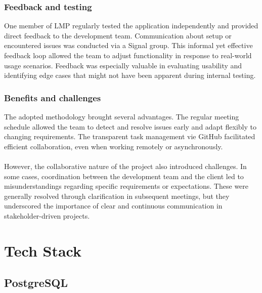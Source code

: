 \documentclass[a4paper,12pt]{report}
\begin{document}
\subsection{Feedback and testing}
One member of LMP regularly tested the application independently and provided direct feedback to the development team. Communication about setup or encountered issues was conducted via a Signal group. This informal yet effective feedback loop allowed the team to adjust functionality in response to real-world usage scenarios. Feedback was especially valuable in evaluating usability and identifying edge cases that might not have been apparent during internal testing.
\subsection{Benefits and challenges}
The adopted methodology brought several advantages. The regular meeting schedule allowed the team to detect and resolve issues early and adapt flexibly to changing requirements. The transparent task management vie GitHub facilitated efficient collaboration, even when working remotely or asynchronously.\\\\
However, the collaborative nature of the project also introduced challenges. In some cases, coordination between the development team and the client led to misunderstandings regarding specific requirements or expectations. These were generally resolved through clarification in subsequent meetings, but they underscored the importance of clear and continuous communication in stakeholder-driven projects. 

\chapter{Tech Stack}
\section{PostgreSQL}
\end{document}
